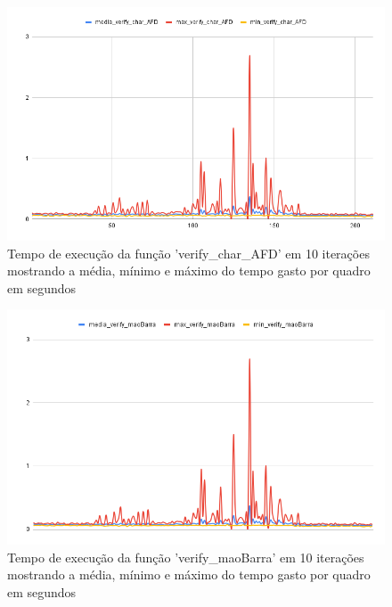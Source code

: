 \begin{figure}[H]
	\centering
	\caption{Tempo de execução da função 'verify\_char\_AFD' em 10 iterações mostrando a média, mínimo e máximo do tempo gasto por quadro em segundos}
	\includegraphics[scale=0.55]{figuras/grafico/char_AFD.png}
\end{figure}



\begin{figure}[H]
	\centering
	\caption{Tempo de execução da função 'verify\_maoBarra' em 10 iterações mostrando a média, mínimo e máximo do tempo gasto por quadro em segundos}
	\includegraphics[scale=0.45]{figuras/grafico/maoBarra.png}
\end{figure}


